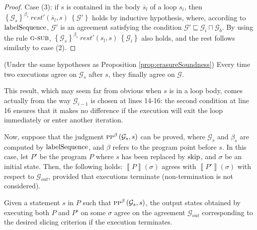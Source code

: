 \documentclass[prodmode,acmtocl]{acmsmall}
\def\prog{\ensuremath{P}\xspace}
\def\state{\ensuremath{\sigma}\xspace}
\newcommand{\0}{\mbox{\bf 0}}
\newcommand{\CODE}[1]{\ensuremath{\mbox{\lstinline!#1!}\xspace}\xspace}
\newcommand{\SEMANTICS}[1]{\left\llbracket #1 \right\rrbracket}
\def\PRED{\beta}
\def\AGREEM{\mathcal{G}}
\newcommand{\GRULENAME}[1]{\textsc{g-#1}}
\newcommand{\PRESERVESB}[3]{\textsc{pp}^{#1}\left(#3,#2\right)}
\newcommand{\TRIPLEB}[4]{\left\{#1\right\}^{#2}\ #3\ \left\{#4\right\}}
\begin{document}
{\begin{proof}
    Case (3): if $s$ is contained in the body $\overline{s}_l$ of a loop
    $s_i$, then
    $\TRIPLEB{\AGREEM_s}{\PRED_s}{\mathit{rest}'(\overline{s}_l,s)}{\AGREEM'}$
    holds by inductive hypothesis, where, according to
    \CODE{labelSequence}, $\AGREEM'$ is an agreement satisfying the
    condition $\AGREEM' \sqsubseteq \AGREEM_i \sqcap \AGREEM_b$.  By
    using the rule $\GRULENAME{sub}$,
    $\TRIPLEB{\AGREEM_s}{\PRED_s}{\mathit{rest}'(s_l,s)}{\AGREEM_i}$
    also holds, and the rest follows similarly to case (2).
  \end{proof}
  
  \begin{corollary}
    \label{prop:erasureSoundnessCorollary}
    (Under the same hypotheses as Proposition
    \ref{prop:erasureSoundness}) Every time two executions agree on
    $\AGREEM_s$ after $s$, they finally agree on $\AGREEM$.
  \end{corollary}
  
  This result, which may seem far from obvious when $s$ is in a loop
  body, comes actually from the way $\AGREEM_{i-1}$ is chosen at lines
  14-16: the second condition at line 16 ensures that it makes no
  difference if the execution will exit the loop immediately or enter
  another iteration.
}

Now, suppose that the judgment $\PRESERVESB{\PRED}{s}{\AGREEM_s}$ can
be proved, where $\AGREEM_s$ and $\PRED_s$ are computed by
\CODE{labelSequence}, and $\PRED$ refers to the program point before
$s$.  In this case, let $\prog'$ be the program $\prog$ where $s$ has
been replaced by $\CODE{skip}$, and $\state$ be an initial state.
Then, the following holds: $\SEMANTICS{\prog}(\state)$ agrees with
$\SEMANTICS{\prog'}(\state)$ with respect to $\AGREEM_{out}$, provided
that executions terminate (non-termination is not considered).

\begin{proposition}
  \label{prop:soundnessPreservation}
  Given a statement $s$ in $\prog$ such that
  $\PRESERVESB{\PRED}{s}{\AGREEM_s}$, the output states obtained by
  executing both $\prog$ and $\prog'$ on some $\state$ agree on the
  agreement $\AGREEM_{out}$ corresponding to the desired slicing
  criterion if the execution terminates.
\end{proposition}
\end{document}
